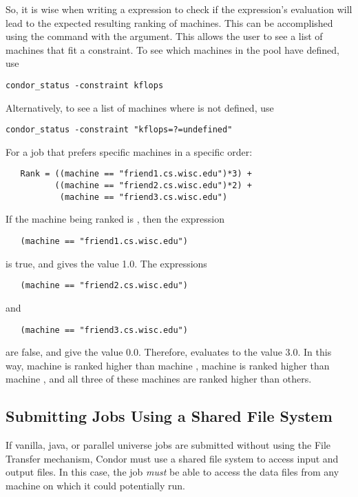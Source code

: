 So, it is wise when writing a  expression to check
if the expression's evaluation will lead to the expected
resulting ranking of machines.
This can be accomplished using the  command with the
 argument.  This allows the user to see a list of
machines that fit a constraint.
To see which machines in the pool have  defined,
use
\begin{verbatim}
condor_status -constraint kflops
\end{verbatim}
Alternatively, to see a list of machines where 
 is not defined, use
\begin{verbatim}
condor_status -constraint "kflops=?=undefined"
\end{verbatim}

For a job that prefers specific machines in a specific order:
\begin{verbatim}
   Rank = ((machine == "friend1.cs.wisc.edu")*3) +
          ((machine == "friend2.cs.wisc.edu")*2) +
           (machine == "friend3.cs.wisc.edu")
\end{verbatim}
If the machine being ranked is , then the
expression
\begin{verbatim}
   (machine == "friend1.cs.wisc.edu")
\end{verbatim}
is true, and gives the value 1.0.
The expressions
\begin{verbatim}
   (machine == "friend2.cs.wisc.edu")
\end{verbatim}
and
\begin{verbatim}
   (machine == "friend3.cs.wisc.edu")
\end{verbatim}
are false, and give the value 0.0.
Therefore,  evaluates to the value 3.0.
In this way, machine  is ranked higher than
machine ,
machine 
is ranked higher than 
machine ,
and all three of these machines are ranked higher than others.

\subsection{\label{sec:shared-fs}
Submitting Jobs Using a Shared File System} 

If vanilla, java, or parallel universe
jobs are submitted without using the File Transfer mechanism, 
Condor must use a shared file system to access input and output
files. 
In this case, the job \emph{must} be able to access the data files
from any machine on which it could potentially run.

